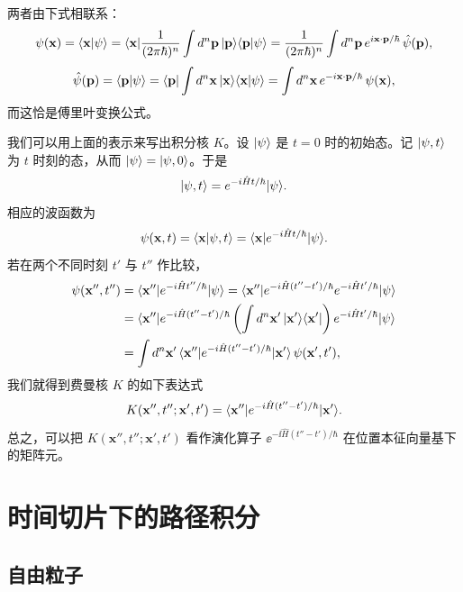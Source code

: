 两者由下式相联系：
\[
\psi(\mathbf{x})=\langle \mathbf{x}|\psi\rangle
=\langle \mathbf{x}|\frac{1}{(2\pi\hbar)^n}\int d^n\mathbf{p}\,
|\mathbf{p}\rangle\langle \mathbf{p}|\psi\rangle
=\frac{1}{(2\pi\hbar)^n}\int d^n\mathbf{p}\,
e^{i\mathbf{x}\cdot\mathbf{p}/\hbar}\,\hat\psi(\mathbf{p}),
\]
\[
\hat\psi(\mathbf{p})=\langle \mathbf{p}|\psi\rangle
=\langle \mathbf{p}|\int d^n\mathbf{x}\,|\mathbf{x}\rangle\langle \mathbf{x}|\psi\rangle
=\int d^n\mathbf{x}\,e^{-i\mathbf{x}\cdot\mathbf{p}/\hbar}\,\psi(\mathbf{x}),
\]
而这恰是傅里叶变换公式。


我们可以用上面的表示来写出积分核 $K$。设 $|\psi\rangle$ 是 $t=0$ 时的初始态。记 $|\psi,t\rangle$ 为 $t$ 时刻的态，从而 $|\psi\rangle=|\psi,0\rangle$。于是
\[
|\psi,t\rangle=e^{-i\hat Ht/\hbar}|\psi\rangle.
\]
相应的波函数为
\[
\psi(\mathbf{x},t)=\langle \mathbf{x}|\psi,t\rangle
=\langle \mathbf{x}|e^{-i\hat Ht/\hbar}|\psi\rangle.
\]
若在两个不同时刻 $t'$ 与 $t''$ 作比较，
\[
\begin{aligned}
\psi(\mathbf{x}'',t'')
&=\langle \mathbf{x}''|e^{-i\hat Ht''/\hbar}|\psi\rangle
=\langle \mathbf{x}''|e^{-i\hat H(t''-t')/\hbar}e^{-i\hat Ht'/\hbar}|\psi\rangle\\
&=\langle \mathbf{x}''|e^{-i\hat H(t''-t')/\hbar}
\left(\int d^n\mathbf{x}'\,|\mathbf{x}'\rangle\langle \mathbf{x}'|\right)
e^{-i\hat Ht'/\hbar}|\psi\rangle\\
&=\int d^n\mathbf{x}'\,
\langle \mathbf{x}''|e^{-i\hat H(t''-t')/\hbar}|\mathbf{x}'\rangle
\,\psi(\mathbf{x}',t'),
\end{aligned}
\]
我们就得到费曼核 $K$ 的如下表达式
\[
K(\mathbf{x}'',t'';\mathbf{x}',t')
=\langle \mathbf{x}''|e^{-i\hat H(t''-t')/\hbar}|\mathbf{x}'\rangle.
\]
总之，可以把 $K(\mathbf{x}'',t'';\mathbf{x}',t')$ 看作演化算子 $\ee^{-\ii\hat H(t''-t')/\hbar}$ 在位置本征向量基下的矩阵元。

\section{时间切片下的路径积分}

\subsection{自由粒子}

